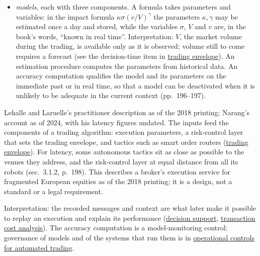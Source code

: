 \begin{qfdefinition}
\begin{itemize}
\item \emph{models}, each with three components. A formula takes parameters and variables: in the impact formula $\kappa\sigma(v/V)^\gamma$ the parameters $\kappa,\gamma$ may be estimated once a day and stored, while the variables $\sigma$, $V$ and $v$ are, in the book's words, ``known in real time''. Interpretation: $V$, the market volume during the trading, is available only as it is observed; volume still to come requires a forecast (see the decision-time item in \hyperref[def:trading-envelope]{trading envelope}). An estimation procedure computes the parameters from historical data. An accuracy computation qualifies the model and its parameters on the immediate past or in real time, so that a model can be deactivated when it is unlikely to be adequate in the current context (pp.~196--197).
\end{itemize}

 Lehalle and Laruelle's practitioner description as of the 2018 printing; Narang's account as of 2024, with his latency figures undated. The inputs feed the components of a trading algorithm: execution parameters, a risk-control layer that sets the trading envelope, and tactics such as smart order routers (\hyperref[def:trading-envelope]{trading envelope}). For latency, some autonomous tactics sit as close as possible to the venues they address, and the risk-control layer at equal distance from all its robots (sec.~3.1.2, p.~198). This describes a broker's execution service for fragmented European equities as of the 2018 printing; it is a design, not a standard or a legal requirement.

 Interpretation: the recorded messages and context are what later make it possible to replay an execution and explain its performance (\hyperref[meth:execution-decision-support]{decision support}, \hyperref[meth:transaction-cost-analysis]{transaction cost analysis}). The accuracy computation is a model-monitoring control: governance of models and of the systems that run them is in \hyperref[meth:automated-trading-operational-controls]{operational controls for automated trading}.


\end{qfdefinition}

